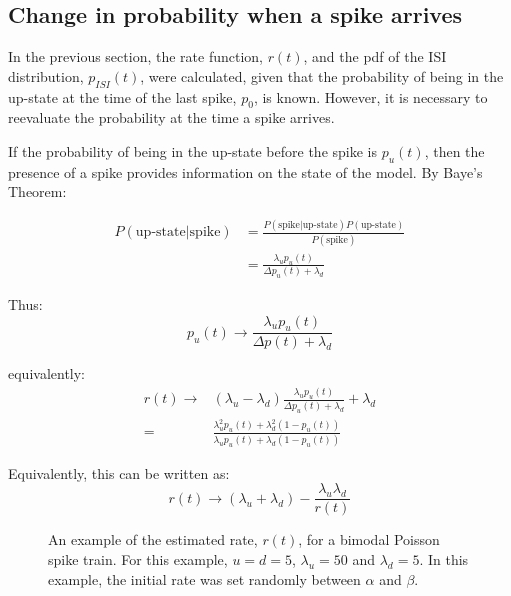 \subsection{Change in probability when a spike arrives}

In the previous section, the rate function, $r(t)$, and the pdf of the ISI distribution, $p_{ISI}(t)$, were calculated, given that the probability of being in the up-state at the time of the last spike, $p_0$, is known.  However, it is necessary to reevaluate the probability at the time a spike arrives.

If the probability of being in the up-state before the spike is $p_u(t)$, then the presence of a spike provides information on the state of the model. By Baye's Theorem:

\begin{equation}
\begin{split}
P(\mbox{up-state} | \mbox{spike}) &= \frac{P(\mbox{spike}|\mbox{up-state})P(\mbox{up-state})}{P(\mbox{spike})} \\
&=\frac{\lambda_u p_u(t)}{\Delta p_u(t) + \lambda_d }
\end{split}
\end{equation}

Thus:
\begin{equation}
p_u(t) \rightarrow \frac{\lambda_u p_u(t)}{\Delta p(t) + \lambda_d}
\end{equation}

equivalently:
\begin{equation}
\begin{split}
r(t) \rightarrow &(\lambda_u - \lambda_d)\frac{\lambda_u p_u(t)}{\Delta p_u(t)+ \lambda_d} + \lambda_d\\
= & \frac{\lambda_u^2 p_u(t) + \lambda_d^2(1-p_u(t))}{\lambda_up_u(t) + \lambda_d(1-p_u(t))}
\end{split}
\end{equation}

Equivalently, this can be written as:
\begin{equation}
r(t) \rightarrow (\lambda_u +\lambda_d) - \frac{\lambda_u\lambda_d}{r(t)}
\end{equation}

\begin{figure}[htb]

\caption{An example of the estimated rate, $r(t)$, for a bimodal Poisson spike train.  For this example, $u=d=5$, $\lambda_u=50$ and $\lambda_d=5$.  In this example, the initial rate was set randomly between $\alpha$ and $\beta$.}
\end{figure}

